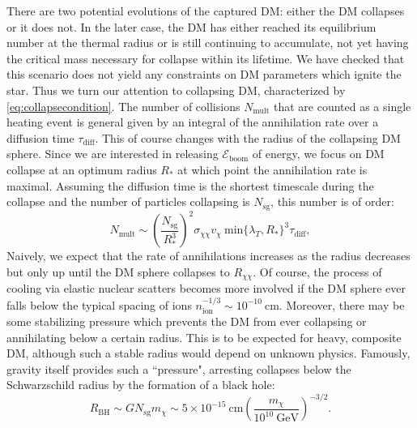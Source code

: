 \documentclass[preprintnumbers,amsmath,amssymb,prd,superscriptaddress]{revtex4}
\newcommand{\Eboom}{\mathcal{E}_\text{boom}}
\newcommand{\GeV}{\text{GeV}}
\newcommand{\cm}{\text{cm}}
\def\r{\right)}
\def\l{\left(}
\begin{document}
There are two potential evolutions of the captured DM: either the DM collapses or it does not. 
In the later case, the DM has either reached its equilibrium number at the thermal radius or is still continuing to accumulate, not yet having the critical mass necessary for collapse within its lifetime.
We have checked that this scenario does not yield any constraints on DM parameters which ignite the star. 
Thus we turn our attention to collapsing DM, characterized by \eqref{eq:collapsecondition}. 
The number of collisions $N_\text{mult}$ that are counted as a single heating event is general given by an integral of the annihilation rate over a diffusion time $\tau_\text{diff}$.
This of course changes with the radius of the collapsing DM sphere.
Since we are interested in releasing $\Eboom$ of energy, we focus on DM collapse at an optimum radius $R_*$ at which point the annihilation rate is maximal.
Assuming the diffusion time is the shortest timescale during the collapse and the number of particles collapsing is $N_\text{sg}$, this number is of order:
\begin{equation}
\label{eq:nmulti}
N_\text{mult} \sim \l \frac{N_\text{sg}}{R_*^3}\r^2  \sigma_{\chi \chi} v_\chi ~\text{min}\{\lambda_T, R_*\}^3 \tau_\text{diff},
\end{equation}
Naively, we expect that the rate of annihilations increases as the radius decreases but only up until the DM sphere collapses to $R_{\chi \chi}$.
Of course, the process of cooling via elastic nuclear scatters becomes more involved if the DM sphere ever falls below the typical spacing of ions $n_\text{ion}^{-1/3} \sim 10^{-10} ~\text{cm}$. 
Moreover, there may be some stabilizing pressure which prevents the DM from ever collapsing or annihilating below a certain radius.
This is to be expected for heavy, composite DM, although such a stable radius would depend on unknown physics. 
Famously, gravity itself provides such a ``pressure", arresting collapses below the Schwarzschild radius by the formation of a black hole:
\begin{equation}
R_\text{BH} \sim G N_\text{sg} m_\chi \sim 5 \times 10^{-15} ~\cm \l \frac{m_\chi}{10^{10} ~\GeV} \r^{-3/2}.
\end{equation}
\end{document}
